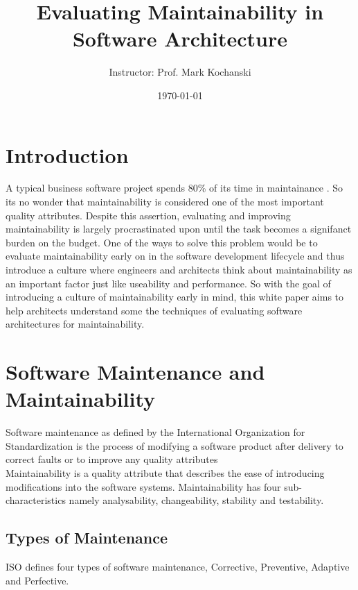 \documentclass[15pt]{article}
\title{Evaluating Maintainability in Software Architecture}
\author{\Author \and
Instructor: Prof. Mark Kochanski}
\date{\today}
\begin{document}



\maketitle

\newpage

\section{Introduction}
A typical business software project spends 80\% of its time in maintainance \cite{pigoski_practical_1996}. So its no wonder that maintainability is considered one of the most important quality attributes. Despite this assertion, evaluating and improving maintainability is largely procrastinated upon until the task becomes a signifanct burden on the budget. One of the ways to solve this problem would be to evaluate maintainability early on in the software development lifecycle and thus introduce a culture where engineers and architects think about maintainability as an important factor just like useability and performance. So with the goal of introducing a culture of maintainability early in mind, this white paper aims to help architects understand some the techniques of evaluating software architectures for maintainability.


\section{Software Maintenance and Maintainability}
Software maintenance as defined by the International Organization for Standardization is the process of modifying a software product after delivery to correct faults or to improve any quality attributes \cite{_international_2006} \\

Maintainability is a quality attribute that describes the ease of introducing modifications into the software systems. Maintainability has four sub-characteristics namely analysability, changeability, stability and testability\cite{_international_2006}.\\

\subsection{Types of Maintenance}
ISO defines four types of software maintenance, Corrective, Preventive, Adaptive and Perfective. \\
\end{document}
